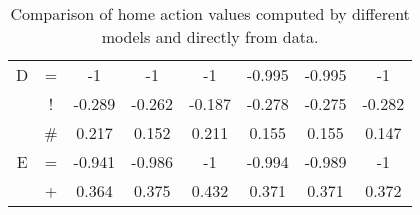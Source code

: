 \documentclass{sfuthesis}
\begin{document}
\begin{table}
\begin{tabular}{cccccccc}
			D              & \multicolumn{1}{c|}{=}                & -1                 & -1                  & -1                & -0.995         & \multicolumn{1}{c|}{-0.995}             & -1            \\
			& \multicolumn{1}{c|}{!}                & -0.289             & -0.262              & -0.187            & -0.278         & \multicolumn{1}{c|}{-0.275}             & -0.282        \\
			& \multicolumn{1}{c|}{\#}               & 0.217              & 0.152               & 0.211             & 0.155          & \multicolumn{1}{c|}{0.155}              & 0.147         \\ \hline
			E              & \multicolumn{1}{c|}{=}                & -0.941             & -0.986              & -1                & -0.994         & \multicolumn{1}{c|}{-0.989}             & -1            \\
			& \multicolumn{1}{c|}{+}                & 0.364              & 0.375               & 0.432             & 0.371          & \multicolumn{1}{c|}{0.371}              & 0.372        
		\end{tabular}
		\caption{Comparison of home action values computed by different models and directly from data.}
		\label{tab:qvalues_home}
	\end{table}
	
\end{document}
